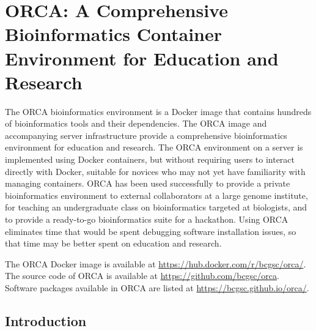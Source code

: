 \documentclass[
  12pt,
  oneside,
  openany]{book}
\begin{document}
\hypertarget{orca-a-comprehensive-bioinformatics-container-environment-for-education-and-research}{%
\chapter{ORCA: A Comprehensive Bioinformatics Container Environment for Education and Research}\label{orca-a-comprehensive-bioinformatics-container-environment-for-education-and-research}}


The ORCA bioinformatics environment is a Docker image that contains hundreds of bioinformatics tools and their dependencies. The ORCA image and accompanying server infrastructure provide a comprehensive bioinformatics environment for education and research. The ORCA environment on a server is implemented using Docker containers, but without requiring users to interact directly with Docker, suitable for novices who may not yet have familiarity with managing containers. ORCA has been used successfully to provide a private bioinformatics environment to external collaborators at a large genome institute, for teaching an undergraduate class on bioinformatics targeted at biologists, and to provide a ready-to-go bioinformatics suite for a hackathon. Using ORCA eliminates time that would be spent debugging software installation issues, so that time may be better spent on education and research.

The ORCA Docker image is available at \url{https://hub.docker.com/r/bcgsc/orca/}. The source code of ORCA is available at \url{https://github.com/bcgsc/orca}. Software packages available in ORCA are listed at \url{https://bcgsc.github.io/orca/}.

\hypertarget{introduction-3}{%
\section{Introduction}\label{introduction-3}}
\end{document}
